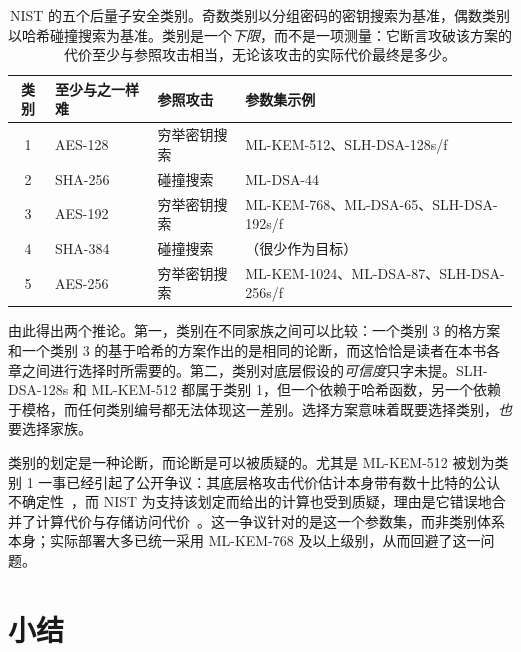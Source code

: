 \begin{table}[H]
\centering
\small
\begin{tabular}{@{}cllp{4.6cm}@{}}
\toprule
类别 & 至少与之一样难 & 参照攻击 & 参数集示例 \\
\midrule
1 & AES-128 & 穷举密钥搜索 & ML-KEM-512、SLH-DSA-128s/f \\
2 & SHA-256 & 碰撞搜索      & ML-DSA-44 \\
3 & AES-192 & 穷举密钥搜索 & ML-KEM-768、ML-DSA-65、SLH-DSA-192s/f \\
4 & SHA-384 & 碰撞搜索      & （很少作为目标） \\
5 & AES-256 & 穷举密钥搜索 & ML-KEM-1024、ML-DSA-87、SLH-DSA-256s/f \\
\bottomrule
\end{tabular}
\caption{NIST 的五个后量子安全类别。奇数类别以分组密码的密钥搜索为基准，偶数类别以哈希碰撞搜索为基准。类别是一个\emph{下限}，而不是一项测量：它断言攻破该方案的代价至少与参照攻击相当，无论该攻击的实际代价最终是多少。}
\label{tab:nist-categories}
\end{table}

由此得出两个推论。第一，类别在不同家族之间可以比较：一个类别 3 的格方案和一个类别 3 的基于哈希的方案作出的是相同的论断，而这恰恰是读者在本书各章之间进行选择时所需要的。第二，类别对底层假设的\emph{可信度}只字未提。SLH-DSA-128s 和 ML-KEM-512 都属于类别 1，但一个依赖于哈希函数，另一个依赖于模格，而任何类别编号都无法体现这一差别。选择方案意味着既要选择类别，\emph{也}要选择家族。

类别的划定是一种论断，而论断是可以被质疑的。尤其是 ML-KEM-512 被划为类别 1 一事已经引起了公开争议：其底层格攻击代价估计本身带有数十比特的公认不确定性~\cite{matzov2022}，而 NIST 为支持该划定而给出的计算也受到质疑，理由是它错误地合并了计算代价与存储访问代价~\cite{bernstein2023kyber}。这一争议针对的是这一个参数集，而非类别体系本身；实际部署大多已统一采用 ML-KEM-768 及以上级别，从而回避了这一问题。

\section{小结}

